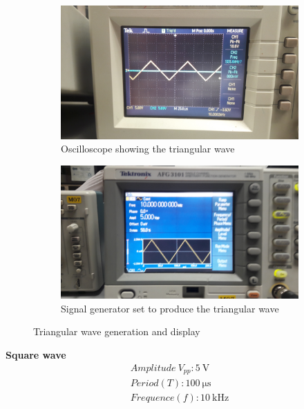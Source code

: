 \documentclass[letterpaper]{article}
\begin{document}
\begin{figure}[H]
    \begin{subfigure}{0.55\textwidth}
        \includegraphics[width=.95\linewidth]{img/part2/7}
        \caption{Oscilloscope showing the triangular wave}
    \end{subfigure}
    \begin{subfigure}{0.55\textwidth}
        \includegraphics[width=.95\linewidth]{img/part2/5}
        \caption{Signal generator set to produce the triangular wave}
    \end{subfigure}
    \caption{Triangular wave generation and display}
\end{figure}
{\textbf{Square wave}}
\begin{gather*}
    Amplitude\ V_{pp}: \SI{5}{\volt}\\
    Period(T): \SI{100}{\micro\second}\\
    Frequence(f): \SI{10}{\kilo\hertz}
\end{gather*}
\end{document}
